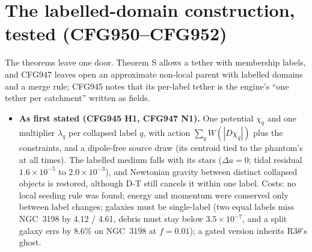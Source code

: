 \documentclass[10pt]{article}
\begin{document}
\section{The labelled-domain construction, tested (CFG950--CFG952)}
The theorems leave one door. Theorem S allows a tether with membership labels, and CFG947 leaves open an approximate non-local parent with labelled domains and a merge rule; CFG945 notes that its per-label tether is the engine's ``one tether per catchment'' written as fields.
\begin{itemize}
\item \textbf{As first stated (CFG945 H1, CFG947 N1).} One potential $\chi_q$ and one multiplier $\lambda_q$ per collapsed label $q$, with action $\sum_q W(|D\chi_q|)$ plus the constraints, and a dipole-free source draw (its centroid tied to the phantom's at all times). The labelled medium falls with its stars ($\Delta a=0$; tidal residual $1.6\times10^{-5}$ to $2.0\times10^{-3}$), and Newtonian gravity between distinct collapsed objects is restored, although D-T still cancels it within one label. Costs: no local seeding rule was found; energy and momentum were conserved only between label changes; galaxies must be single-label (two equal labels miss NGC~3198 by 4.12 / 4.61, debris must stay below $3.5\times10^{-7}$, and a split galaxy errs by 8.6\% on NGC~3198 at $f=0.01$); a gated version inherits R3$\theta$'s ghost.
\end{itemize}
\end{document}
